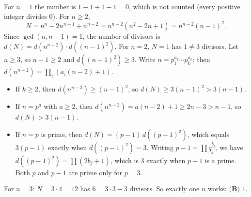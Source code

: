 For $n=1$ the number is $1-1+1-1=0$, which is not counted (every positive integer divides $0$). For $n\ge2$,
\[N=n^n-2n^{n-1}+n^{n-2}=n^{n-2}\left(n^2-2n+1\right)=n^{n-2}(n-1)^2.\]
Since $\gcd(n,n-1)=1$, the number of divisors is $d(N)=d\left(n^{n-2}\right)\cdot d\left((n-1)^2\right)$. For $n=2$, $N=1$ has $1\ne3$ divisors. Let $n\ge3$, so $n-1\ge2$ and $d\left((n-1)^2\right)\ge3$. Write $n=p_1^{a_1}\cdots p_k^{a_k}$; then $d\left(n^{n-2}\right)=\prod_i\left(a_i(n-2)+1\right)$.
\begin{itemize}
\item If $k\ge2$, then $d\left(n^{n-2}\right)\ge(n-1)^2$, so $d(N)\ge3(n-1)^2>3(n-1)$.
\item If $n=p^a$ with $a\ge2$, then $d\left(n^{n-2}\right)=a(n-2)+1\ge2n-3>n-1$, so $d(N)>3(n-1)$.
\item If $n=p$ is prime, then $d(N)=(p-1)\,d\left((p-1)^2\right)$, which equals $3(p-1)$ exactly when $d\left((p-1)^2\right)=3$. Writing $p-1=\prod q_j^{b_j}$, we have $d\left((p-1)^2\right)=\prod(2b_j+1)$, which is $3$ exactly when $p-1$ is a prime. Both $p$ and $p-1$ are prime only for $p=3$.
\end{itemize}
For $n=3$: $N=3\cdot4=12$ has $6=3\cdot3-3$ divisors. So exactly one $n$ works: $\boxed{\textbf{(B) }1}$.
